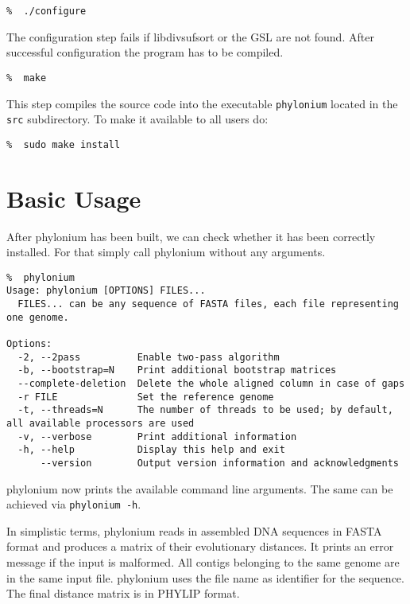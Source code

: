 \documentclass[a4paper,10pt,english]{scrartcl}
\newcommand{\tool}[1]{\textsf{#1}}
\newcommand{\phylonium}{\textsf{phylonium}\xspace}
\begin{document}
\begin{lstlisting}
%  ./configure
\end{lstlisting}

The configuration step fails if \tool{libdivsufsort} or the \tool{GSL} are not found. After successful configuration the program has to be compiled.

\begin{lstlisting}
%  make
\end{lstlisting}

This step compiles the source code into the executable \lstinline!phylonium! located in the \lstinline!src! subdirectory. To make it available to all users do:

\begin{lstlisting}
%  sudo make install
\end{lstlisting}


\section{Basic Usage}

After \phylonium has been built, we can check whether it has been correctly installed. For that simply call \phylonium without any arguments.

\begin{lstlisting}
%  phylonium
Usage: phylonium [OPTIONS] FILES...
  FILES... can be any sequence of FASTA files, each file representing one genome.

Options:
  -2, --2pass          Enable two-pass algorithm
  -b, --bootstrap=N    Print additional bootstrap matrices
  --complete-deletion  Delete the whole aligned column in case of gaps
  -r FILE              Set the reference genome
  -t, --threads=N      The number of threads to be used; by default, all available processors are used
  -v, --verbose        Print additional information
  -h, --help           Display this help and exit
      --version        Output version information and acknowledgments
\end{lstlisting}

\phylonium now prints the available command line arguments. The same can be achieved via \lstinline!phylonium -h!.

In simplistic terms, \phylonium reads in assembled DNA sequences in FASTA format and produces a matrix of their evolutionary distances. It prints an error message if the input is malformed. All contigs belonging to the same genome are in the same input file. \phylonium uses the file name as identifier for the sequence. The final distance matrix is in PHYLIP format.
\end{document}
